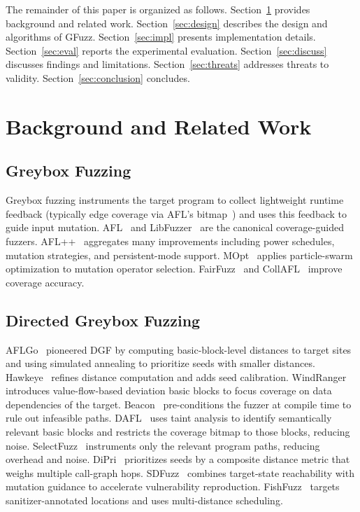 \documentclass[preprint,12pt,3p]{elsarticle}
\begin{document}
The remainder of this paper is organized as follows.
Section~\ref{sec:background} provides background and related work.
Section~\ref{sec:design} describes the design and algorithms of GFuzz.
Section~\ref{sec:impl} presents implementation details.
Section~\ref{sec:eval} reports the experimental evaluation.
Section~\ref{sec:discuss} discusses findings and limitations.
Section~\ref{sec:threats} addresses threats to validity.
Section~\ref{sec:conclusion} concludes.

\section{Background and Related Work}
\label{sec:background}

\subsection{Greybox Fuzzing}

Greybox fuzzing instruments the target program to collect lightweight runtime
feedback (typically edge coverage via AFL's bitmap~\cite{afl}) and uses this
feedback to guide input mutation.  AFL~\cite{afl} and LibFuzzer~\cite{libfuzzer}
are the canonical coverage-guided fuzzers.  AFL++~\cite{aflpp} aggregates
many improvements including power schedules, mutation strategies, and
persistent-mode support.  MOpt~\cite{lyu2019mopt} applies particle-swarm
optimization to mutation operator selection.  FairFuzz~\cite{lemieux2018fairfuzz}
and CollAFL~\cite{gan2018collafl} improve coverage accuracy.

\subsection{Directed Greybox Fuzzing}

AFLGo~\cite{bohme2017directed} pioneered DGF by computing basic-block-level
distances to target sites and using simulated annealing to prioritize seeds
with smaller distances.  Hawkeye~\cite{chen2018hawkeye} refines distance
computation and adds seed calibration.  WindRanger~\cite{zhu2022windranger}
introduces value-flow-based deviation basic blocks to focus coverage on data
dependencies of the target.  Beacon~\cite{huang2022beacon} pre-conditions the
fuzzer at compile time to rule out infeasible paths.  DAFL~\cite{kim2023dafl}
uses taint analysis to identify semantically relevant basic blocks and restricts
the coverage bitmap to those blocks, reducing noise.  SelectFuzz~\cite{luo2023selectfuzz}
instruments only the relevant program paths, reducing overhead and noise.
DiPri~\cite{dipri2023} prioritizes seeds by a composite distance metric that
weighs multiple call-graph hops.  SDFuzz~\cite{sdfuzz2023} combines
target-state reachability with mutation guidance to accelerate vulnerability
reproduction.  FishFuzz~\cite{zheng2023fishfuzz} targets sanitizer-annotated
locations and uses multi-distance scheduling.
\end{document}
